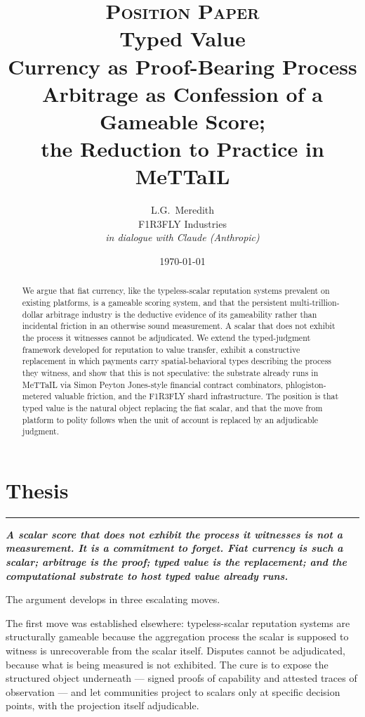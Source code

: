 \documentclass[11pt]{article}
\title{
{\Large \textsc{Position Paper}}\\[0.5em]
{\Huge\color{rhonavy} Typed Value}\\[0.4em]
{\Large Currency as Proof-Bearing Process}\\[0.6em]
\large Arbitrage as Confession of a Gameable Score;\\
\large the Reduction to Practice in MeTTaIL
}
\author{L.G.~Meredith\\\small F1R3FLY Industries\\[0.25em]\small \textit{in dialogue with Claude (Anthropic)}}
\date{\today}
\newcommand{\position}[1]{%
  \medskip
  \begin{quoting}[indentfirst=false, leftmargin=1em, rightmargin=1em]
  \noindent\textcolor{rhosky}{\rule{3pt}{1.2em}}\hspace{0.5em}\textbf{\textit{#1}}
  \end{quoting}
  \medskip
}
\begin{document}
\maketitle

\begin{abstract}
\noindent We argue that fiat currency, like the typeless-scalar reputation systems prevalent on existing platforms, is a gameable scoring system, and that the persistent multi-trillion-dollar arbitrage industry is the deductive evidence of its gameability rather than incidental friction in an otherwise sound measurement. A scalar that does not exhibit the process it witnesses cannot be adjudicated. We extend the typed-judgment framework developed for reputation to value transfer, exhibit a constructive replacement in which payments carry spatial-behavioral types describing the process they witness, and show that this is not speculative: the substrate already runs in MeTTaIL via Simon Peyton Jones-style financial contract combinators, phlogiston-metered valuable friction, and the F1R3FLY shard infrastructure. The position is that typed value is the natural object replacing the fiat scalar, and that the move from platform to polity follows when the unit of account is replaced by an adjudicable judgment.
\end{abstract}

\vspace{1em}

\section{Thesis}

\position{A scalar score that does not exhibit the process it witnesses is not a measurement. It is a commitment to forget. Fiat currency is such a scalar; arbitrage is the proof; typed value is the replacement; and the computational substrate to host typed value already runs.}

The argument develops in three escalating moves.

The first move was established elsewhere: typeless-scalar reputation systems are structurally gameable because the aggregation process the scalar is supposed to witness is unrecoverable from the scalar itself. Disputes cannot be adjudicated, because what is being measured is not exhibited. The cure is to expose the structured object underneath --- signed proofs of capability and attested traces of observation --- and let communities project to scalars only at specific decision points, with the projection itself adjudicable.
\end{document}
